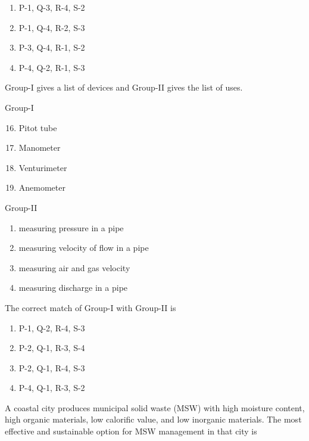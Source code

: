     \begin{multicols}{2}
        \begin{enumerate}
            \item P-1, Q-3, R-4, S-2
            \item P-1, Q-4, R-2, S-3
            \item P-3, Q-4, R-1, S-2
            \item P-4, Q-2, R-1, S-3
        \end{enumerate}
    \end{multicols}

\item Group-I gives a list of devices and Group-II gives the list of uses.
    \begin{multicols}{2}
        Group-I
        \begin{enumerate}[label={\Alph*.}]
            \setcounter{enumii}{15}
            \item Pitot tube
            \item Manometer
            \item Venturimeter
            \item Anemometer
        \end{enumerate}
        \columnbreak
        Group-II
        \begin{enumerate}[label={\arabic*.}]
            \item measuring pressure in a pipe
            \item measuring velocity of flow in a pipe
            \item measuring air and gas velocity
            \item measuring discharge in a pipe
        \end{enumerate}
    \end{multicols}
    The correct match of Group-I with Group-II is
    
    \begin{multicols}{2}
        \begin{enumerate}
            \item P-1, Q-2, R-4, S-3
            \item P-2, Q-1, R-3, S-4
            \item P-2, Q-1, R-4, S-3
            \item P-4, Q-1, R-3, S-2
        \end{enumerate}
    \end{multicols}

\item A coastal city produces municipal solid waste (MSW) with high moisture
content, high organic materials, low calorific value, and low inorganic materials.
The most effective and sustainable option for MSW management in that city is  

